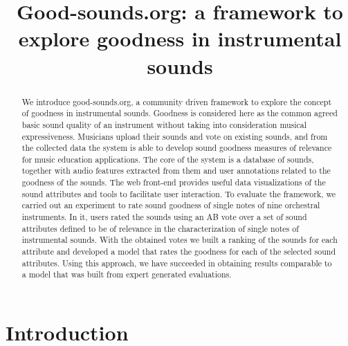 \documentclass{article}
\title{Good-sounds.org: a framework to explore goodness in instrumental sounds}
\begin{document}
%
\maketitle
%
\begin{abstract}
We introduce good-sounds.org, a community driven framework to explore the concept of goodness in instrumental sounds. Goodness is considered here as the common agreed basic sound quality of an instrument without taking into consideration musical expressiveness. Musicians upload their sounds and vote on existing sounds, and from the collected data the system is able to develop sound goodness measures of relevance for music education applications. The core of the system is a database of sounds, together with audio features extracted from them and user annotations related to the goodness of the sounds. The web front-end provides useful data visualizations of the sound attributes and tools to facilitate user interaction. To evaluate the framework, we carried out an experiment to rate sound goodness of single notes of nine orchestral instruments. In it, users rated the sounds using an AB vote over a set of sound attributes defined to be of relevance in the characterization of single notes of instrumental sounds. With the obtained votes we built a ranking of the sounds for each attribute and developed a model that rates the goodness for each of the selected sound attributes. Using this approach, we have succeeded in obtaining results comparable to a model that was built from expert generated evaluations.
\end{abstract}
%
\section{Introduction}\label{sec:introduction}
\end{document}
